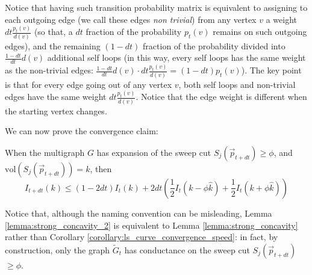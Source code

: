 \documentclass[../main.tex]{subfiles}
\begin{document}

Notice that having such transition probability matrix is equivalent to assigning to each outgoing edge (we call these edges \textit{non trivial}) from any vertex $v$ a weight $dt\frac{p_t(v)}{d(v)}$ (so that, a $dt$ fraction of the probability $p_t(v)$ remains on such outgoing edges), and the remaining $(1-dt)$ fraction of the probability divided into $\frac{1-dt}{dt} d(v)$ additional self loops (in this way, every self loops has the same weight as the non-trivial edges: $\frac{1-dt}{dt} d(v) \cdot dt\frac{p_t(v)}{d(v)} = (1-dt) p_t(v)$). The key point is that for every edge going out of any vertex $v$, both self loops and non-trivial edges have the same weight $dt\frac{p_t(v)}{d(v)}$. Notice that the edge weight is different when the starting vertex changes.

We can now prove the convergence claim:

\begin{lemma}
\label{lemma:strong_concavity_2}
    When the multigraph $G$ has expansion of the sweep cut $S_j(\vec{p}_{t+dt}) \geq \phi$, and  $\text{vol}(S_j(\vec{p}_{t+dt})) = k$, then 
    \begin{equation}
        I_{t+dt}(k) \leq (1-2dt)I_t(k) + 2dt\left(\frac{1}{2}I_t(k - \phi\hat{k}) + \frac{1}{2}I_t(k + \phi\hat{k})\right)
    \end{equation}
\end{lemma}

Notice that, although the naming convention can be misleading, Lemma \ref{lemma:strong_concavity_2} is equivalent to Lemma  \ref{lemma:strong_concavity} rather than Corollary \ref{corollary:ls_curve_convergence_speed}: in fact, by construction, only the graph $\tilde{G}_t$ has conductance on the sweep cut $S_j(\vec{p}_{t+dt})$ $\geq \phi$.
\end{document}
